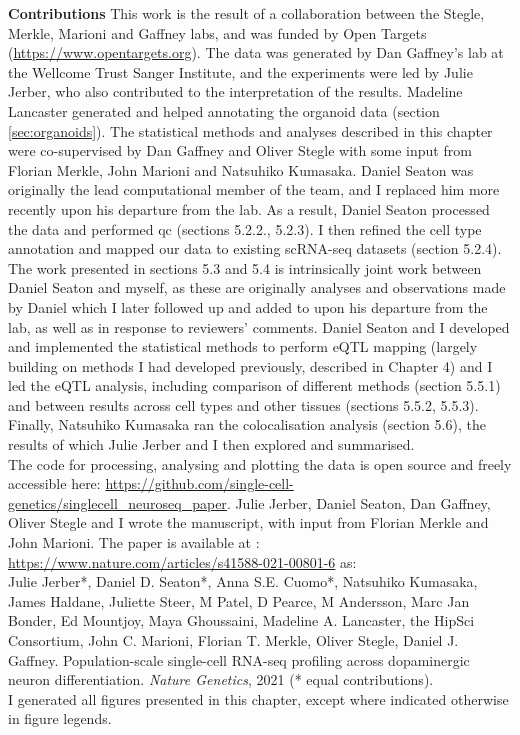 \begin{Comment2}

\hspace{-3mm}\textbf{Contributions} This work is the result of a collaboration between the Stegle, Merkle, Marioni and Gaffney labs, and was funded by Open Targets (\url{https://www.opentargets.org}). 
The data was generated by Dan Gaffney’s lab at the Wellcome Trust Sanger Institute, and the experiments were led by Julie Jerber, who also contributed to the interpretation of the results. 
Madeline Lancaster generated and helped annotating the organoid data (section \ref{sec:organoids}). 
The statistical methods and analyses described in this chapter were co-supervised by Dan Gaffney and Oliver Stegle with some input from Florian Merkle, John Marioni and Natsuhiko Kumasaka. 
Daniel Seaton was originally the lead computational member of the team, and I replaced him more recently upon his departure from the lab.
As a result, Daniel Seaton processed the data and performed \gls{qc} (sections 5.2.2., 5.2.3). 
I then refined the cell type annotation and mapped our data to existing scRNA-seq datasets (section 5.2.4).
The work presented in sections 5.3 and 5.4 is intrinsically joint work between Daniel Seaton and myself, as these are originally analyses and observations made by Daniel which I later followed up and added to upon his departure from the lab, as well as in response to reviewers' comments.
Daniel Seaton and I developed and implemented the statistical methods to perform eQTL mapping (largely building on methods I had developed previously, described in Chapter 4) and I led the eQTL analysis, including comparison of different methods (section 5.5.1) and between results across cell types and other tissues (sections 5.5.2, 5.5.3). 
Finally, Natsuhiko Kumasaka ran the colocalisation analysis (section 5.6), the results of which Julie Jerber and I then explored and summarised.\\

The code for processing, analysing and plotting the data is open source and freely accessible here: \url{https://github.com/single-cell-genetics/singlecell\_neuroseq\_paper}.
Julie Jerber, Daniel Seaton, Dan Gaffney, Oliver Stegle and I wrote the manuscript, with input from Florian Merkle and John Marioni.
The paper \cite{jerber2020population} is available at : \url{https://www.nature.com/articles/s41588-021-00801-6} as:\\

Julie Jerber*, Daniel D. Seaton*, Anna S.E. Cuomo*, Natsuhiko Kumasaka, James Haldane, Juliette Steer, M Patel, D Pearce, M Andersson, Marc Jan Bonder, Ed Mountjoy, Maya Ghoussaini, Madeline A. Lancaster, the HipSci Consortium, John C. Marioni, Florian T. Merkle, Oliver Stegle, Daniel J. Gaffney. Population-scale single-cell RNA-seq profiling across dopaminergic neuron differentiation. \textit{Nature Genetics}, 2021 (* equal contributions). \\

I generated all figures presented in this chapter, except where indicated otherwise in figure legends. 

\end{Comment2}

